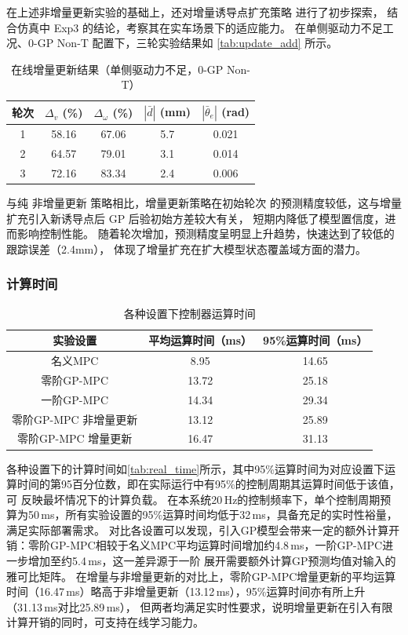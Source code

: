 在上述非增量更新实验的基础上，还对增量诱导点扩充策略
进行了初步探索，
结合仿真中 Exp3 的结论，考察其在实车场景下的适应能力。
在单侧驱动力不足工况、0-GP Non-T 配置下，三轮实验结果如
\autoref{tab:update_add} 所示。
 
\begin{table}[htbp]
\centering
\caption{在线增量更新结果（单侧驱动力不足，0-GP Non-T）}
\label{tab:update_add}
\begin{tabular}{ccccc}
    \toprule
    轮次 & $\Delta_v$ (\%) & $\Delta_\omega$ (\%)
         & $|\bar d|$ (mm) & $|\bar \theta_e|$ (rad) \\
    \midrule
    1 & 58.16 & 67.06 & 5.7 & 0.021 \\
    2 & 64.57 & 79.01 & 3.1 & 0.014 \\
    3 & 72.16 & 83.34 & 2.4 & 0.006 \\
    \bottomrule
\end{tabular}
\end{table}
 
与纯 非增量更新 策略相比，增量更新策略在初始轮次
的预测精度较低，这与增量扩充引入新诱导点后 GP 后验初始方差较大有关，
短期内降低了模型置信度，进而影响控制性能。
随着轮次增加，预测精度呈明显上升趋势，快速达到了较低的跟踪误差（2.4mm），
体现了增量扩充在扩大模型状态覆盖域方面的潜力。

\subsubsection{计算时间}

\begin{table}[htbp]
\centering
\caption{各种设置下控制器运算时间}
\label{tab:real_time}
\begin{tabular}{ccc}
    \toprule
    实验设置 & 平均运算时间（ms） & 95\%运算时间（ms） \\
    \midrule
    名义MPC & 8.95 & 14.65 \\
    零阶GP-MPC & 13.72 & 25.18 \\
    一阶GP-MPC & 14.34 & 29.34 \\
    零阶GP-MPC 非增量更新 & 13.12 & 25.89 \\
    零阶GP-MPC 增量更新 & 16.47 & 31.13 \\
    \bottomrule
\end{tabular}
\end{table}

各种设置下的计算时间如\autoref{tab:real_time}所示，其中95\%运算时间为对应设置下运算时间的第95百分位数，即在实际运行中有95\%的控制周期其运算时间低于该值，可
反映最坏情况下的计算负载。
在本系统20\,Hz的控制频率下，单个控制周期预算为50\,ms，所有实验设置的95\%运算时间均低于32\,ms，具备充足的实时性裕量，满足实际部署需求。
对比各设置可以发现，引入GP模型会带来一定的额外计算开销：零阶GP-MPC相较于名义MPC平均运算时间增加约4.8\,ms，一阶GP-MPC进一步增加至约5.4\,ms，这一差异源于一阶
展开需要额外计算GP预测均值对输入的雅可比矩阵。
在增量与非增量更新的对比上，零阶GP-MPC增量更新的平均运算时间（16.47\,ms）略高于非增量更新（13.12\,ms），95\%运算时间亦有所上升（31.13\,ms对比25.89\,ms），
但两者均满足实时性要求，说明增量更新在引入有限计算开销的同时，可支持在线学习能力。

